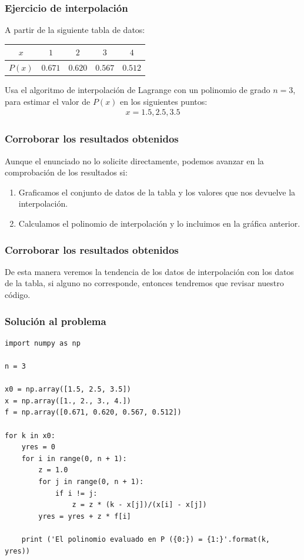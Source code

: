 \documentclass[12pt]{beamer}
\begin{document}
\begin{frame}
\frametitle{Ejercicio de interpolación}
A partir de la siguiente tabla de datos:
\pause
\begin{center}
\renewcommand{\arraystretch}{0.9}
\begin{tabular}{c | c | c | c | c}
$x$ & $1$ & $2$ & $3$ & $4$ \\ \hline
$P (x)$ & $0.671$ & $0.620$ & $0.567$ & $0.512$ \\
\end{tabular}
\end{center}
\pause
Usa el algoritmo de interpolación de Lagrange con un polinomio de grado $n = 3$, para estimar el valor de $P (x)$ en los siguientes puntos:
\begin{align*}
x = 1.5, 2.5, 3.5
\end{align*}
\end{frame}
\begin{frame}
\frametitle{Corroborar los resultados obtenidos}
Aunque el enunciado no lo solicite directamente, podemos avanzar en la comprobación de los resultados si:
\begin{enumerate}[<+->]
\item Graficamos el conjunto de datos de la tabla y los valores que nos devuelve la interpolación.
\item Calculamos el polinomio de interpolación y lo incluimos en la gráfica anterior.
\end{enumerate}
\end{frame}
\begin{frame}
\frametitle{Corroborar los resultados obtenidos}
De esta manera veremos la tendencia de los datos de interpolación con los datos de la tabla, si alguno no corresponde, entonces tendremos que revisar nuestro código.
\end{frame}
\begin{frame}
\frametitle{Solución al problema}
\begin{lstlisting}[caption=Código para la interpolación de Lagrange]
import numpy as np

n = 3

x0 = np.array([1.5, 2.5, 3.5])
x = np.array([1., 2., 3., 4.])
f = np.array([0.671, 0.620, 0.567, 0.512])

for k in x0:
    yres = 0
    for i in range(0, n + 1):
        z = 1.0
        for j in range(0, n + 1):
            if i != j:
                z = z * (k - x[j])/(x[i] - x[j])
        yres = yres + z * f[i] 
    
    print ('El polinomio evaluado en P ({0:}) = {1:}'.format(k,  yres))
\end{lstlisting}
\end{frame}
\end{document}
